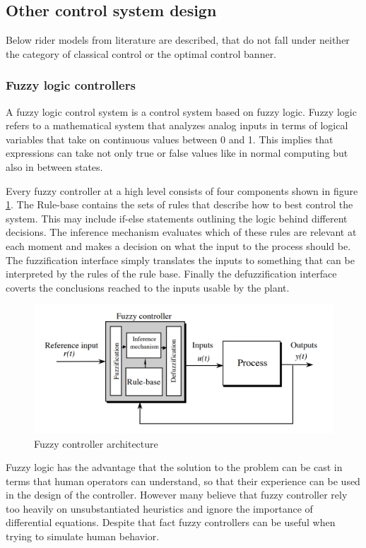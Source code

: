 \subsection{Other control system design} \label{ch:other}

Below  rider models from literature are described,  that do not fall under neither the  category of classical control  or the optimal control banner.
\subsubsection{Fuzzy logic controllers}
A fuzzy logic control system is a control system based on fuzzy logic. Fuzzy logic refers to a mathematical system that analyzes analog inputs in terms of logical variables that take on continuous values between 0 and 1. This implies that expressions can take not only true or false  values like in normal computing  but also in between states. 
\par
Every fuzzy controller at a high level consists of four components shown in figure \ref{fig:figure15}. The Rule-base contains the sets of rules that describe how to best control the system. This may include if-else statements outlining the logic behind different decisions. The inference mechanism evaluates which of these rules are relevant at each moment and makes a decision on what the input to the process should be. The fuzzification interface simply translates the inputs to something that can be interpreted by the rules of the rule base. Finally the defuzzification interface coverts the conclusions reached to the inputs usable by the plant.

\begin{figure}[ht]
    \centering
    \includegraphics[scale=0.45]{images/fuzzy_controller.png}
    \caption{Fuzzy controller architecture \cite{Passino:1997:FC:550057} }
    \label{fig:figure15}
\end{figure}
\par
Fuzzy logic has the advantage that the solution to the problem can be cast in terms that human operators can understand, so that their experience can be used in the design of the controller. However many believe that fuzzy controller rely too heavily on unsubstantiated heuristics and ignore the importance of differential equations. Despite that fact fuzzy controllers can be useful when trying to simulate human behavior.

